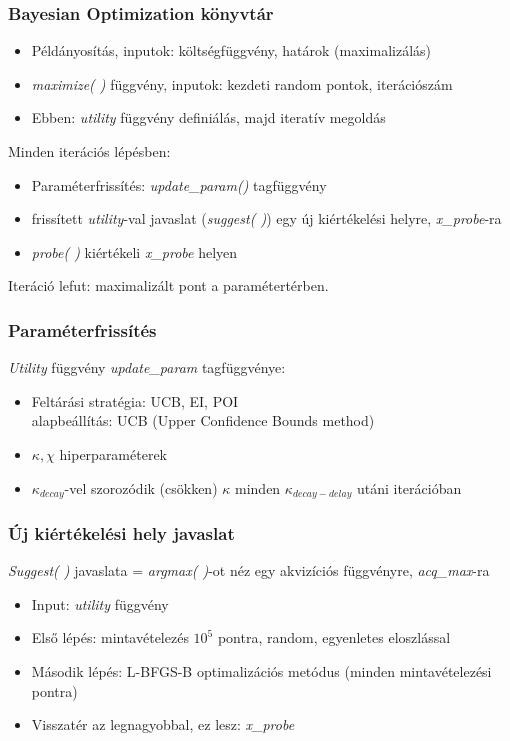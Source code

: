 \documentclass[aspectratio=43]{beamer}
\begin{document}
\begin{frame}
	\frametitle{Bayesian Optimization könyvtár}
	\begin{itemize}
		\item Példányosítás, inputok: költségfüggvény, határok 
		(maximalizálás)
		\item \textit{maximize( )} függvény, inputok: kezdeti random pontok, iterációszám
		\item Ebben: \textit{utility} függvény definiálás, majd iteratív megoldás
	\end{itemize}
	\pause
	Minden iterációs lépésben:
	\begin{itemize}
		\item Paraméterfrissítés: \textit{update\_param()} tagfüggvény
		\item frissített \textit{utility}-val javaslat (\textit{suggest( )}) egy új kiértékelési helyre, \textit{x\_probe}-ra
		\item \textit{probe( )} kiértékeli \textit{x\_probe} helyen
	\end{itemize}
	Iteráció lefut: maximalizált pont a paramétertérben.
\end{frame}

\begin{frame}
	\frametitle{Paraméterfrissítés}
	\textit{Utility} függvény \textit{update\_param} tagfüggvénye:
	\begin{itemize}
		\item Feltárási stratégia: UCB, EI, POI\\alapbeállítás: UCB (Upper Confidence Bounds method)
		\item $\kappa, \chi$ hiperparaméterek
		\item $\kappa_{decay}$-vel szorozódik (csökken) $\kappa$ minden $\kappa_{decay-delay}$ utáni iterációban
	\end{itemize}
\end{frame}

\begin{frame}
	\frametitle{Új kiértékelési hely javaslat}
	\textit{Suggest( )} javaslata = \textit{argmax( )}-ot néz egy akvizíciós függvényre, \textit{acq\_max}-ra
	\begin{itemize}
		\item Input: \textit{utility} függvény
		\item Első lépés: mintavételezés $10^5$ pontra, random, egyenletes eloszlással
		\item Második lépés: L-BFGS-B optimalizációs metódus (minden mintavételezési pontra)
		\item Visszatér az legnagyobbal, ez lesz: \textit{x\_probe}
	\end{itemize}
\end{frame}
\end{document}
